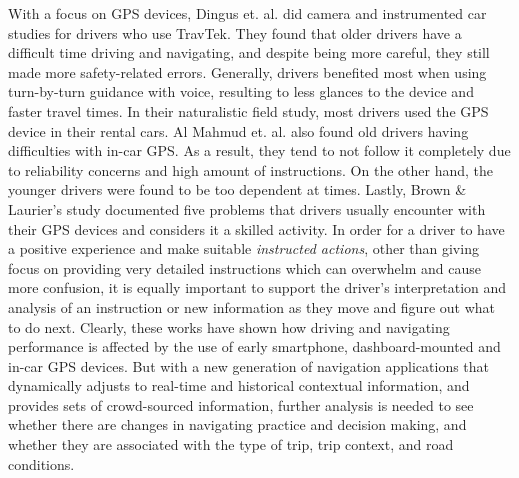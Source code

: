 With a focus on GPS devices, Dingus et. al. \cite{Dingus1997a} did camera and instrumented car studies for drivers who use TravTek. They found that older drivers have a difficult time driving and navigating, and despite being more careful, they still made more safety-related errors. Generally, drivers benefited most when using turn-by-turn guidance with voice, resulting to less glances to the device and faster travel times. In their naturalistic field study, most drivers used the GPS device in their rental cars. Al Mahmud et. al. \cite{Mahmud2009UserDrivers} also found old drivers having difficulties with in-car GPS. As a result, they tend to not follow it completely due to reliability concerns and high amount of instructions. On the other hand, the younger drivers were found to be too dependent at times. Lastly, Brown \& Laurier's study \cite{Brown2012TheGPS} documented five problems that drivers usually encounter with their GPS devices and considers it a skilled activity. In order for a driver to have a positive experience and make suitable \emph{instructed actions}, other than giving focus on providing very detailed instructions which can overwhelm and cause more confusion, it is equally important to support the driver's interpretation and analysis of an instruction or new information as they move and figure out what to do next. Clearly, these works have shown how driving and navigating performance is affected by the use of early smartphone, dashboard-mounted and in-car GPS devices. But with a new generation of navigation applications that dynamically adjusts to real-time and historical contextual information, and provides sets of crowd-sourced information, further analysis is needed to see whether there are changes in navigating practice and decision making, and whether they are associated with the type of trip, trip context, and road conditions.

